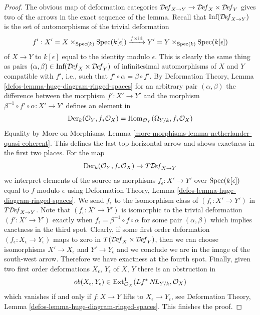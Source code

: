 \begin{proof}
The obvious map of deformation categories
$\mathcal{D}\!\mathit{ef}_{X \to Y} \to
\mathcal{D}\!\mathit{ef}_X \times \mathcal{D}\!\mathit{ef}_Y$
gives two of the arrows in the exact sequence of the lemma.
Recall that $\text{Inf}(\mathcal{D}\!\mathit{ef}_{X \to Y})$
is the set of automorphisms of the trivial deformation
$$
f' :  X' = X \times_{\mathop{\mathrm{Spec}}(k)} \mathop{\mathrm{Spec}}(k[\epsilon])
\xrightarrow{f \times \text{id}}
Y' = Y \times_{\mathop{\mathrm{Spec}}(k)} \mathop{\mathrm{Spec}}(k[\epsilon])
$$
of $X \to Y$ to $k[\epsilon]$ equal to the identity modulo $\epsilon$.
This is clearly the same thing as pairs
$(\alpha, \beta) \in
\text{Inf}(\mathcal{D}\!\mathit{ef}_X \times \mathcal{D}\!\mathit{ef}_Y)$
of infinitesimal automorphisms of $X$ and $Y$ compatible with $f'$, i.e.,
such that $f' \circ \alpha = \beta \circ f'$.
By Deformation Theory, Lemma \ref{defos-lemma-huge-diagram-ringed-spaces}
for an arbitrary pair $(\alpha, \beta)$ the difference between
the morphism $f' : X' \to Y'$ and the morphism
$\beta^{-1} \circ f' \circ \alpha : X' \to Y'$ defines an element
in
$$
\text{Der}_k(\mathcal{O}_Y, f_*\mathcal{O}_X) =
\mathop{\mathrm{Hom}}\nolimits_{\mathcal{O}_Y}(\Omega_{Y/k}, f_*\mathcal{O}_X)
$$
Equality by More on Morphisms, Lemma
\ref{more-morphisms-lemma-netherlander-quasi-coherent}.
This defines the last top horizontal arrow and shows exactness
in the first two places. For the map
$$
\text{Der}_k(\mathcal{O}_Y, f_*\mathcal{O}_X)
\to
T\mathcal{D}\!\mathit{ef}_{X \to Y}
$$
we interpret elements of the source as morphisms
$f_\epsilon : X' \to Y'$ over $\mathop{\mathrm{Spec}}(k[\epsilon])$
equal to $f$ modulo $\epsilon$
using Deformation Theory, Lemma \ref{defos-lemma-huge-diagram-ringed-spaces}.
We send $f_\epsilon$ to the isomorphism class of
$(f_\epsilon : X' \to Y')$ in $T\mathcal{D}\!\mathit{ef}_{X \to Y}$.
Note that $(f_\epsilon : X' \to Y')$ is isomorphic to the
trivial deformation $(f' : X' \to Y')$ exactly when
$f_\epsilon  = \beta^{-1} \circ f \circ \alpha$ for some
pair $(\alpha, \beta)$ which implies exactness in the third spot.
Clearly, if some first order deformation
$(f_\epsilon : X_\epsilon \to Y_\epsilon)$
maps to zero in $T(\mathcal{D}\!\mathit{ef}_X \times \mathcal{D}\!\mathit{ef}_Y)$,
then we can choose isomorphisms $X' \to X_\epsilon$ and $Y' \to Y_\epsilon$
and we conclude we are in the image of the south-west arrow.
Therefore we have exactness at the fourth spot.
Finally, given two first order deformations $X_\epsilon$, $Y_\epsilon$
of $X$, $Y$ there is an obstruction in
$$
ob(X_\epsilon, Y_\epsilon) \in
\text{Ext}^1_{\mathcal{O}_X}(Lf^*\mathop{N\!L}\nolimits_{Y/k}, \mathcal{O}_X)
$$
which vanishes if and only if $f : X \to Y$ lifts to
$X_\epsilon \to Y_\epsilon$, see
Deformation Theory, Lemma \ref{defos-lemma-huge-diagram-ringed-spaces}.
This finishes the proof.
\end{proof}

